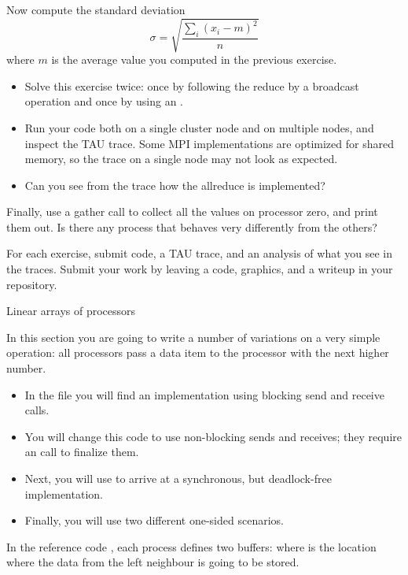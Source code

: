 \begin{exercise}
  Now compute the standard deviation
  \[ \sigma = \sqrt{\frac{ \sum_i (x_i-m)^2 }{n} } \]
  where $m$ is the average value you computed in the previous exercise.
  \begin{itemize}
  \item Solve this exercise twice: once by following the reduce by a
    broadcast operation and once by using an .
  \item Run your code both on a single cluster node and on multiple
    nodes, and inspect the TAU trace. Some MPI implementations are
    optimized for shared memory, so the trace on a single node may not
    look as expected.
  \item Can you see from the trace how the allreduce is implemented?
  \end{itemize}
\end{exercise}

\begin{exercise}
  Finally, use a gather call to collect all the values on processor
  zero, and print them out. Is there any process that behaves very
  differently from the others?
\end{exercise}

\begin{istc}
For each exercise, submit code, a TAU trace, and an analysis of what
you see in the traces. Submit your work by leaving a code, graphics,
and a writeup in your repository.
\end{istc}

 {Linear arrays of processors}

In this section you are going to write a number of variations on
a very simple operation: 
all processors pass a data item to the processor with the next higher
number.
\begin{itemize}
\item In the file  you will find an implementation
  using blocking send and receive calls.
\item You will change this code to use non-blocking sends and
  receives; they require an  call to finalize them.
\item Next, you will use  to arrive at a synchronous,
  but deadlock-free implementation.
\item Finally, you will use two different one-sided scenarios.
\end{itemize}
In the reference code , each process defines two buffers:
where  is the location where the data from the left neighbour is going to be stored.

